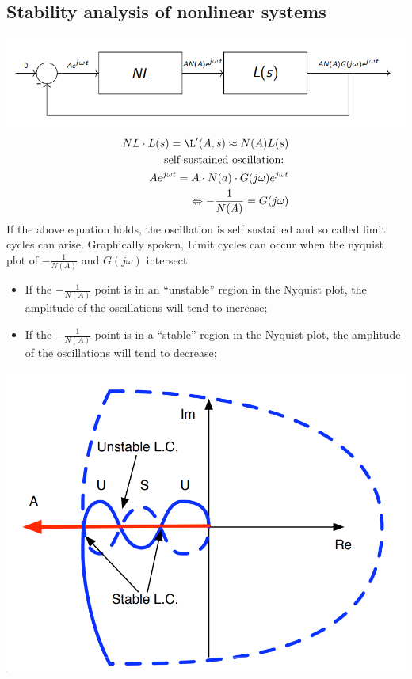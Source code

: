 \subsection{Stability analysis of nonlinear systems}
    \includegraphics[width = \linewidth]{src/images/nonlinear_stability_block_diagram.png}
    \begin{align*}
        NL \cdot L(s) = \L'(A, s) \approx N(A) L(s)\\
        \text{self-sustained oscillation: }\\
        A e^{j \omega t} = A \cdot N(a) \cdot G(j \omega) e^{j \omega t}\\
        \Leftrightarrow - \frac{1}{N(A)} = G(j \omega)
    \end{align*}
    If the above equation holds, the oscillation is self sustained and so called limit cycles can arise.
    Graphically spoken, Limit cycles can occur when the nyquist plot of $- \frac{1}{N(A)}$ and $G(j \omega)$ intersect\\
    \begin{itemize}
        \item If the $-\frac{1}{N(A)}$ point is in an “unstable” region in the Nyquist plot, the amplitude of the
        oscillations will tend to increase;
        \item If the $-\frac{1}{N(A)}$ point is in a “stable” region in the Nyquist plot, the amplitude of the
        oscillations will tend to decrease;
    \end{itemize}
    \includegraphics[width = \linewidth]{src/images/nonlinearity_stability_limit_cycles.png}